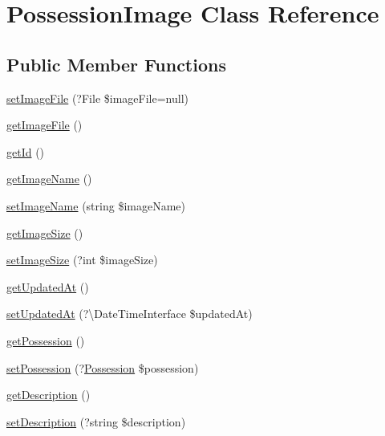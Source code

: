 \hypertarget{class_app_1_1_entity_1_1_possession_image}{}\section{Possession\+Image Class Reference}
\label{class_app_1_1_entity_1_1_possession_image}
\subsection*{Public Member Functions}
\begin{DoxyCompactItemize}
\item 
\mbox{\hyperlink{class_app_1_1_entity_1_1_possession_image_afe1e5b6950ecff63ff841b5f6b0b819c}{set\+Image\+File}} (?File \$image\+File=null)
\item 
\mbox{\hyperlink{class_app_1_1_entity_1_1_possession_image_ae3109cb4ea5ad176dab6f13b519a126e}{get\+Image\+File}} ()
\item 
\mbox{\hyperlink{class_app_1_1_entity_1_1_possession_image_a12251d0c022e9e21c137a105ff683f13}{get\+Id}} ()
\item 
\mbox{\hyperlink{class_app_1_1_entity_1_1_possession_image_aaf32631867a60dd7cfa734b52e0ffb66}{get\+Image\+Name}} ()
\item 
\mbox{\hyperlink{class_app_1_1_entity_1_1_possession_image_a052a851fdebac9ad21640b1f83c8e1cd}{set\+Image\+Name}} (string \$image\+Name)
\item 
\mbox{\hyperlink{class_app_1_1_entity_1_1_possession_image_a86204d3b19a7438ad81ca90f7be6a893}{get\+Image\+Size}} ()
\item 
\mbox{\hyperlink{class_app_1_1_entity_1_1_possession_image_a176700d1e873f13f21a8edad3a6688ca}{set\+Image\+Size}} (?int \$image\+Size)
\item 
\mbox{\hyperlink{class_app_1_1_entity_1_1_possession_image_a789bc1a92b41cf8c0958231bc1f27131}{get\+Updated\+At}} ()
\item 
\mbox{\hyperlink{class_app_1_1_entity_1_1_possession_image_aa43d960f580739f26eb6ac18ce384ed7}{set\+Updated\+At}} (?\textbackslash{}Date\+Time\+Interface \$updated\+At)
\item 
\mbox{\hyperlink{class_app_1_1_entity_1_1_possession_image_a4ad5c74255a75f0d61664cba32657af7}{get\+Possession}} ()
\item 
\mbox{\hyperlink{class_app_1_1_entity_1_1_possession_image_ad625cd7a23ddbd219c5f6b58e85f2977}{set\+Possession}} (?\mbox{\hyperlink{class_app_1_1_entity_1_1_possession}{Possession}} \$possession)
\item 
\mbox{\hyperlink{class_app_1_1_entity_1_1_possession_image_a2e7bb35c71bf1824456ceb944cb7a845}{get\+Description}} ()
\item 
\mbox{\hyperlink{class_app_1_1_entity_1_1_possession_image_acee77db44e361e2773e2734033f2a1c5}{set\+Description}} (?string \$description)
\end{DoxyCompactItemize}


